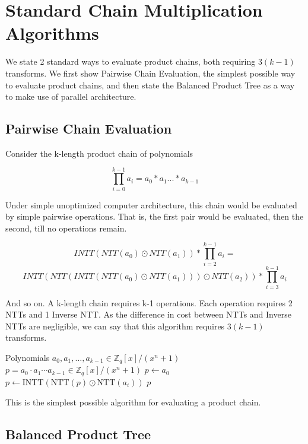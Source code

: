 \documentclass[runningheads]{llncs}
\begin{document}
\section{Standard Chain Multiplication Algorithms}

We state 2 standard ways to evaluate product chains, both requiring $3(k-1)$ transforms. We first show Pairwise Chain Evaluation, the simplest possible way to evaluate product chains, and then state the Balanced Product Tree as a way to make use of parallel architecture.

\subsection{Pairwise Chain Evaluation}

Consider the k-length product chain of polynomials

$$\prod_{i=0}^{k-1}a_i=a_0 *a_1...*a_{k-1}$$

Under simple unoptimized computer architecture, this chain would be evaluated by simple pairwise operations. That is, the first pair would be evaluated, then the second, till no operations remain.

$$INTT(NTT(a_0)\odot NTT(a_1))*\prod_{i=2}^{k-1}a_i=$$
$$INTT(NTT(INTT(NTT(a_0)\odot NTT(a_1)))\odot NTT(a_2))*\prod^{k-1}_{i=3}a_i$$

And so on. A k-length chain requires k-1 operations. Each operation requires 2 NTTs and 1 Inverse NTT. As the difference in cost between NTTs and Inverse NTTs are negligible, we can say that this algorithm requires $3(k-1)$ transforms.

\begin{algorithm}
\caption{Pairwise Multiplication}
\begin{algorithmic}[1]
\Require Polynomials $a_0, a_1, \dots, a_{k-1} \in \mathbb{Z}_q[x]/(x^n+1)$
\Ensure $p = a_0 \cdot a_1 \cdots a_{k-1} \in \mathbb{Z}_q[x]/(x^n+1)$
\State $p \gets a_0$
    \State $p \gets \mathrm{INTT}(\mathrm{NTT}(p) \odot \mathrm{NTT}(a_i))$
\EndFor
\State \Return $p$
\end{algorithmic}
\end{algorithm}

This is the simplest possible algorithm for evaluating a product chain. 

\subsection{Balanced Product Tree}
\end{document}
